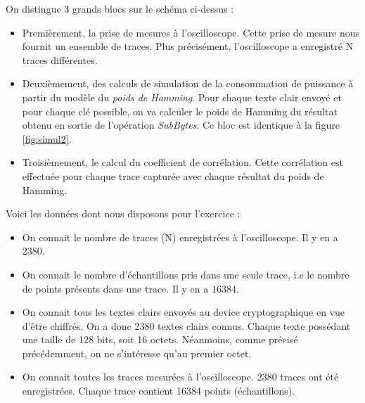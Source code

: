 \documentclass[10pt, oneside, a4paper]{article}
\begin{document}
\vspace{-0.3 cm}On distingue 3 grands blocs sur le schéma ci-dessus :
\begin{itemize}
\item Premièrement, la prise de mesures à l'oscilloscope. Cette prise de mesure nous fournit un ensemble de traces. Plus précisément, l'oscilloscope a enregistré N traces différentes.
\item Deuxièmement, des calculs de simulation de la consommation de puissance à partir du modèle du \textit{poids de Hamming}. Pour chaque texte clair envoyé et pour chaque clé possible, on va calculer le poids de Hamming du résultat obtenu en sortie de l'opération \textit{SubBytes}. Ce bloc est identique à la figure \ref{fig:simul2}.
\item Troisièmement, le calcul du coefficient de corrélation. Cette corrélation est effectuée pour chaque trace capturée avec chaque résultat du poids de Hamming. 
\end{itemize}

\hspace{-0.5 cm}Voici les données dont nous disposons pour l'exercice :
\begin{itemize}
\item On connait le nombre de traces (N) enregistrées à l'oscilloscope. Il y en a 2380.
\item On connait le nombre d'échantillons pris dans une seule trace, i.e le nombre de points présents dans une trace. Il y en a 16384.
\item On connait tous les textes clairs envoyés au device cryptographique en vue d'être chiffrés. On a donc 2380 textes clairs connus. Chaque texte possédant une taille de 128 bits, soit 16 octets. Néanmoins, comme précisé précédemment, on ne s'intéresse qu'au premier octet.
\item On connait toutes les traces mesurées à l'oscilloscope. 2380 traces ont été enregistrées. Chaque trace contient 16384 points (échantillons). \\
\end{itemize}
\end{document}
